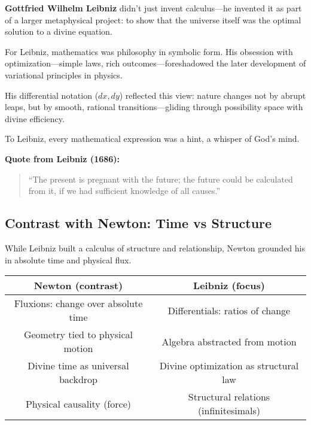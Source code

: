 \begin{tcolorbox}[colback=blue!5!white, colframe=blue!50!black, 
  title={Historical Sidebar: Leibniz—Calculus, Harmony, and the Divine Algorithm}]
  
  \textbf{Gottfried Wilhelm Leibniz} didn’t just invent calculus—he invented it as part of a larger metaphysical project: to show that the universe itself was the optimal solution to a divine equation.

  For Leibniz, mathematics was philosophy in symbolic form.  
  His obsession with optimization—simple laws, rich outcomes—foreshadowed the later development of variational principles in physics.

  \medskip

  His differential notation (\( dx, dy \)) reflected this view: nature changes not by abrupt leaps, but by smooth, rational transitions—gliding through possibility space with divine efficiency.

  \medskip

  To Leibniz, every mathematical expression was a hint, a whisper of God's mind.

  \medskip

  \textbf{Quote from Leibniz (1686):}
  \begin{quote}
  “The present is pregnant with the future; the future could be calculated from it, if we had sufficient knowledge of all causes.”
  \end{quote}
  
\end{tcolorbox}

\subsection{Contrast with Newton: Time vs Structure}

While Leibniz built a calculus of structure and relationship, Newton grounded his in absolute time and physical flux.

\begin{center}
\begin{tabular}{c|c}
\textbf{Newton (contrast)} & \textbf{Leibniz (focus)} \\
\hline
Fluxions: change over absolute time & Differentials: ratios of change \\
Geometry tied to physical motion & Algebra abstracted from motion \\
Divine time as universal backdrop & Divine optimization as structural law \\
Physical causality (force) & Structural relations (infinitesimals) \\
\end{tabular}
\end{center}

